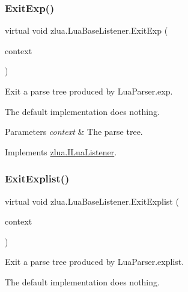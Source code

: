 \subsubsection{\texorpdfstring{Exit\+Exp()}{ExitExp()}}
{\footnotesize\ttfamily virtual void zlua.\+Lua\+Base\+Listener.\+Exit\+Exp (\begin{DoxyParamCaption}\item[{\mbox{[}\+Not\+Null\mbox{]} \mbox{\hyperlink{classzlua_1_1_lua_parser_1_1_exp_context}{Lua\+Parser.\+Exp\+Context}}}]{context }\end{DoxyParamCaption})\hspace{0.3cm}{\ttfamily [virtual]}}



Exit a parse tree produced by Lua\+Parser.\+exp. 

The default implementation does nothing.


\begin{DoxyParams}{Parameters}
{\em context} & The parse tree.\\
\hline
\end{DoxyParams}


Implements \mbox{\hyperlink{interfacezlua_1_1_i_lua_listener_adb4a861f691615f081c5910a78e507bd}{zlua.\+I\+Lua\+Listener}}.

\mbox{\label{classzlua_1_1_lua_base_listener_a35af8fb9b7bc09c657281846943392a8}} 
\subsubsection{\texorpdfstring{Exit\+Explist()}{ExitExplist()}}
{\footnotesize\ttfamily virtual void zlua.\+Lua\+Base\+Listener.\+Exit\+Explist (\begin{DoxyParamCaption}\item[{\mbox{[}\+Not\+Null\mbox{]} \mbox{\hyperlink{classzlua_1_1_lua_parser_1_1_explist_context}{Lua\+Parser.\+Explist\+Context}}}]{context }\end{DoxyParamCaption})\hspace{0.3cm}{\ttfamily [virtual]}}



Exit a parse tree produced by Lua\+Parser.\+explist. 

The default implementation does nothing.


